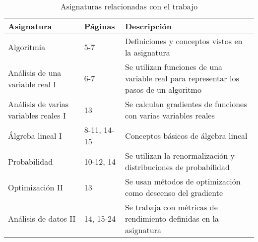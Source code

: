 \documentclass[12pt,twoside]{article}
\begin{document}
\begin{table}[H]
    \centering
    \begin{tabular}{l l p{7cm}}
        \hline
        Asignatura & Páginas & Descripción \\
        \hline
        Algoritmia & 5-7 & Definiciones y conceptos vistos en la asignatura \\
        Análisis de una variable real I & 6-7 & Se utilizan funciones de una variable real para representar los pasos de un algoritmo \\
        Análisis de varias variables reales I & 13 & Se calculan gradientes de funciones con varias variables reales \\
        Álgreba lineal I & 8-11, 14-15 & Conceptos básicos de álgebra lineal \\
        Probabilidad & 10-12, 14 & Se utilizan la renormalización y distribuciones de probabilidad \\
        Optimización II & 13 & Se usan métodos de optimización como descenso del gradiente \\ 
        Análisis de datos II & 14, 15-24 & Se trabaja con métricas de rendimiento definidas en la asignatura \\
        \hline
    \end{tabular}
    \caption{Asignaturas relacionadas con el trabajo}
    \label{tab:asignaturas}
\end{table}
\end{document}
